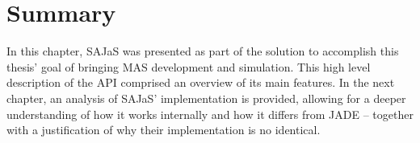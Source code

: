 \section{Summary}

In this chapter, SAJaS was presented as part of the solution to accomplish this thesis' goal of bringing MAS development and simulation. This high level description of the API comprised an overview of its main features. In the next chapter, an analysis of SAJaS' implementation is provided, allowing for a deeper understanding of how it works internally and how it differs from JADE -- together with a justification of why their implementation is no identical.